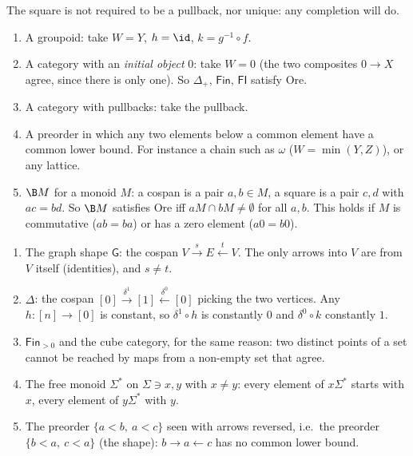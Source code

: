 The square is not required to be a pullback, nor unique: any completion will do.

\begin{example}\label{ex:orehold}
\begin{enumerate}
\item A groupoid: take $W = Y$, $h = \id$, $k = g^{-1}\circ f$.
\item A category with an \emph{initial object} $0$: take $W = 0$ (the two composites $0\to X$ agree, since there is only one). So $\Delta_+$, $\mathsf{Fin}$, $\mathsf{FI}$ satisfy Ore.
\item A category with pullbacks: take the pullback.
\item A preorder in which any two elements below a common element have a common lower bound. For instance a chain such as $\omega$ ($W=\min(Y,Z)$), or any lattice.
\item $\B M$ for a monoid $M$: a cospan is a pair $a,b\in M$, a square is a pair $c,d$ with $ac = bd$. So $\B M$ satisfies Ore iff $aM\cap bM\neq\emptyset$ for all $a,b$. This holds if $M$ is commutative ($ab = ba$) or has a zero element ($a0 = b0$).
\end{enumerate}
\end{example}

\begin{example}\label{ex:orefail}
\begin{enumerate}
\item The graph shape $\mathsf G$: the cospan $V\xrightarrow{s}E\xleftarrow{t}V$. The only arrows into $V$ are from $V$ itself (identities), and $s\neq t$.
\item $\Delta$: the cospan $[0]\xrightarrow{\delta^1}[1]\xleftarrow{\delta^0}[0]$ picking the two vertices. Any $h : [n]\to[0]$ is constant, so $\delta^1\circ h$ is constantly $0$ and $\delta^0\circ k$ constantly $1$.
\item $\mathsf{Fin}_{>0}$ and the cube category, for the same reason: two distinct points of a set cannot be reached by maps from a non-empty set that agree.
\item The free monoid $\Sigma^*$ on $\Sigma\ni x,y$ with $x\neq y$: every element of $x\Sigma^*$ starts with $x$, every element of $y\Sigma^*$ with $y$.
\item The  preorder $\{a<b,\ a<c\}$ seen with arrows reversed, i.e.\ the preorder $\{b<a,\ c<a\}$ (the \q{$\Lambda$} shape): $b\to a\leftarrow c$ has no common lower bound.
\end{enumerate}
\end{example}

